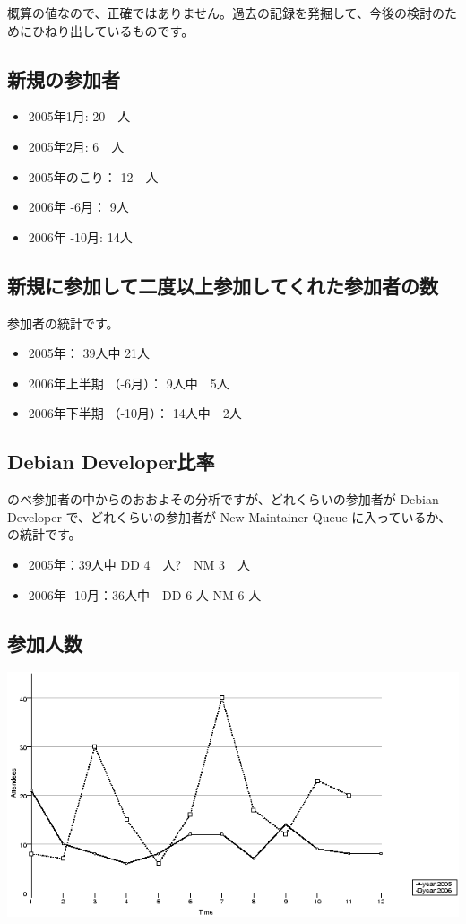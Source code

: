 \documentclass[mingoth,a4paper]{jsarticle}
\begin{document}
概算の値なので、正確ではありません。過去の記録を発掘して、今後の検討のた
めにひねり出しているものです。

\subsection{新規の参加者}

\begin{itemize}
 \item 2005年1月: 20　人
 \item 2005年2月: 6　人
 \item 2005年のこり： 12　人
 \item 2006年 -6月： 9人
 \item 2006年 -10月: 14人
\end{itemize}

\subsection{新規に参加して二度以上参加してくれた参加者の数}

参加者の統計です。

\begin{itemize}
 \item 2005年： 39人中 21人
 \item 2006年上半期 （-6月）： 9人中　5人
 \item 2006年下半期 （-10月）： 14人中　2人
\end{itemize}

\subsection{Debian Developer比率}

のべ参加者の中からのおおよその分析ですが、どれくらいの参加者が Debian
Developer で、どれくらいの参加者が New Maintainer Queue に入っているか、
の統計です。

\begin{itemize}
 \item 2005年：39人中 DD 4　人?　NM 3　人
 \item 2006年 -10月：36人中　DD 6 人 NM 6 人
\end{itemize}

\subsection{参加人数}

\includegraphics[width=1\hsize]{image200612/people-chart.png}
\end{document}
